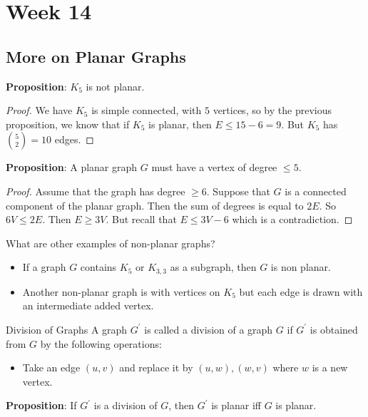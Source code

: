 \documentclass{report}
\begin{document}
\chapter{Week 14}

\begin{topic}
    \section{More on Planar Graphs}
\end{topic}

\textbf{Proposition}: $K_{5}$ is not planar.
    \begin{proof}
        We have $K_{5}$ is simple connected, with $5$ vertices, so by the previous proposition, we know that if $K_{5}$ is planar, then $E \leq 15 - 6 = 9$. But $K_{5}$ has $\binom{5}{2} = 10$ edges.
    \end{proof}

\textbf{Proposition}: A planar graph $G$ must have a vertex of degree $\leq 5$.
    \begin{proof}
        Assume that the graph has degree $\geq 6$. Suppose that $G$ is a connected component of the planar graph. Then the sum of degrees is equal to $2E$. So $6V \leq 2E$. Then $E  \geq 3V$. But recall that $E \leq 3V - 6$ which is a contradiction.
    \end{proof}

What are other examples of non-planar graphs?
    \begin{itemize}
        \item If a graph $G$ contains $K_{5}$ or $K_{3, 3}$ as a subgraph, then $G$ is non planar.

        \item Another non-planar graph is with vertices on $K_{5}$ but each edge is drawn with an intermediate added vertex. 
    \end{itemize}

\begin{definition}{Division of Graphs}
    A graph $G^{\prime}$ is called a division of a graph $G$ if $G^{\prime}$ is obtained from $G$ by the following operations:
        \begin{itemize}
            \item Take an edge $(u, v)$ and replace it by $(u, w), (w, v)$ where $w$ is a new vertex. 
        \end{itemize}
\end{definition}

\textbf{Proposition}: If $G^{\prime}$ is a division of $G$, then $G^{\prime}$ is planar iff $G$ is planar.
\end{document}
